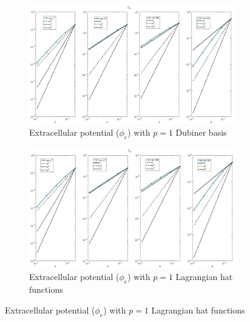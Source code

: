 \documentclass[a4paper,11pt]{article}
\begin{document}
\begin{figure}[H] 
	\caption{Comparison of the extracellular potential ($\phi_e$)}
	\label{Phie_1_mean}
	\begin{subfigure}{\textwidth}
		\begin{center}
			\includegraphics[width = \textwidth]{./errors/D1_Phie_2.jpg}
			\caption{Extracellular potential ($\phi_e$) with $p=1$ Dubiner basis}
		\end{center}
	\end{subfigure}
	\begin{subfigure}{\textwidth}
		\begin{center}
			\includegraphics[width =\textwidth]{./errors/P1_Phie_2.jpg}
			\caption{Extracellular potential ($\phi_e$) with $p=1$ Lagrangian hat functions}
		\end{center}
	\end{subfigure}
\end{figure}
\end{document}
